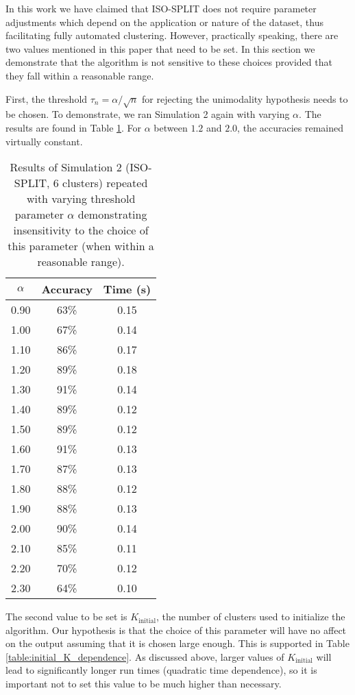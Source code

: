 \documentclass[10pt]{article}
\begin{document}
In this work we have claimed that ISO-SPLIT does not require parameter adjustments which depend on the application or nature of the dataset, thus facilitating fully automated clustering. However, practically speaking, there are two values mentioned in this paper that need to be set. In this section we demonstrate that the algorithm is not sensitive to these choices provided that they fall within a reasonable range.

First, the threshold $\tau_n=\alpha/\sqrt{n}$ for rejecting the unimodality hypothesis needs to be chosen. To demonstrate, we ran Simulation 2 again with varying $\alpha$. The results are found in Table \ref{table:alpha_dependence}. For $\alpha$ between $1.2$ and $2.0$, the accuracies remained virtually constant.

  \begin{table}[t]
\centering
    \begin{tabular}{c|c|c|}
	\textbf{$\alpha$} & \textbf{Accuracy} & \textbf{Time (s)} \\
	\hline
0.90 & 63\% & 0.15 \\
1.00 & 67\% & 0.14 \\
1.10 & 86\% & 0.17 \\
1.20 & 89\% & 0.18 \\
1.30 & 91\% & 0.14 \\
1.40 & 89\% & 0.12 \\
1.50 & 89\% & 0.12 \\
1.60 & 91\% & 0.13 \\
1.70 & 87\% & 0.13 \\
1.80 & 88\% & 0.12 \\
1.90 & 88\% & 0.13 \\
2.00 & 90\% & 0.14 \\
2.10 & 85\% & 0.11 \\
2.20 & 70\% & 0.12 \\
2.30 & 64\% & 0.10 \\
\end{tabular}
\caption{
\label{table:alpha_dependence}
Results of Simulation 2 (ISO-SPLIT, 6 clusters) repeated with varying threshold parameter $\alpha$ demonstrating insensitivity to the choice of this parameter (when within a reasonable range).
}
\end{table}

The second value to be set is $K_{\text{initial}}$, the number of clusters used to initialize the algorithm. Our hypothesis is that the choice of this parameter will have no affect on the output assuming that it is chosen large enough. This is supported in Table \ref{table:initial_K_dependence}. As discussed above, larger values of $K_{\text{initial}}$ will lead to significantly longer run times (quadratic time dependence), so it is important not to set this value to be much higher than necessary. 
\end{document}
